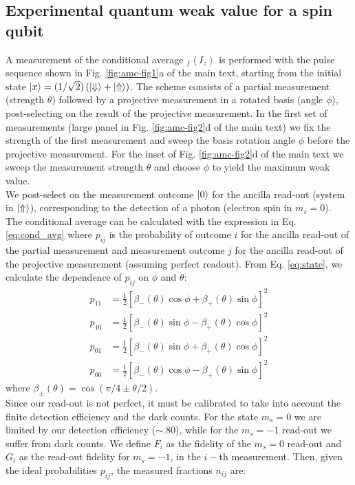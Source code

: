 \subsection {Experimental quantum weak value for a spin qubit}
A measurement of the conditional average $ _f \left \langle I_z \right \rangle$ is performed with the pulse sequence shown in Fig. \ref{fig:amc-fig1}a of the main text, starting from the initial state $\left|x\right> = (1/\sqrt{2}) \left( \left|\Downarrow\right> + \left|\Uparrow\right> \right)$. The scheme consists of a partial measurement (strength $\theta$) followed by a projective measurement in a rotated basis (angle $\phi$), post-selecting on the result of the projective measurement. In the first set of measurements (large panel in Fig. \ref{fig:amc-fig2}d of the main text) we fix the strength of the first measurement and sweep the basis rotation angle $\phi$ before the projective measurement. For the inset of Fig. \ref{fig:amc-fig2}d of the main text we sweep the measurement strength $\theta$ and choose $\phi$ to yield the maximum weak value. \\
We post-select on the measurement outcome $\left|0\right>$ for the ancilla read-out (system in $\left|\Uparrow\right>$), corresponding to the detection of a photon (electron spin in $m_s=0$). \\
The conditional average can be calculated with the expression in Eq. \ref {eq:cond_avg} where $p_{ij}$ is the probability of outcome $i$ for the ancilla read-out of the partial measurement and measurement outcome $j$ for the ancilla read-out of the projective measurement (assuming perfect readout). From Eq. \ref{eq:state}, we calculate the dependence of $p_{ij}$ on $\phi$ and $\theta$:
\begin{equation}
\label{eq:prob_wm}
  \begin{split}
  p_{11}&=\frac{1}{2} \left[ \beta_-(\theta) \cos\phi + \beta_+ (\theta) \sin\phi \right]^2  \\
  p_{10}&= \frac{1}{2} \left[ \beta_-(\theta) \sin\phi - \beta_+ (\theta) \cos\phi\right]^2 \\
  p_{01}&= \frac{1}{2} \left[ \beta_-(\theta) \sin\phi + \beta_+ (\theta) \cos\phi\right]^2 \\
  p_{00}&=\frac{1}{2} \left[ \beta_-(\theta) \cos\phi - \beta_+ (\theta) \sin\phi \right]^2 
  \end{split}
\end{equation}
where $\beta_{\pm} (\theta) = \cos (\pi/4 \pm \theta/2)$.\\
 
Since our read-out is not perfect, it must be calibrated to take into account the finite detection efficiency and the dark counts. For the state $m_s=0$ we are limited by our detection efficiency ($\sim .80$), while for the $m_s=-1$ read-out we suffer from dark counts. We define $F_i$ as the fidelity of the $m_s=0$ read-out and $G_i$ as the read-out fidelity for $m_s=-1$, in the $i-$th measurement.
Then, given the ideal probabilities $p_{ij}$, the measured fractions $n_{ij}$ are:
 
